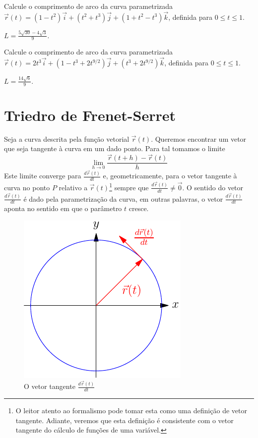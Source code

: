 \begin{exer} \label{exe_co_arc4}
Calcule o comprimento de arco da curva parametrizada $\vec{r}(t) = (1-t^2) \vec{i} + (t^2+t^3) \vec{j} + (1+t^2-t^3)\vec{k}$, definida para $0 \leq t \leq 1$.
\end{exer}
\begin{resp} $ L = \frac{5 \sqrt{30}-4\sqrt{3}}{9} $.
\end{resp}



\begin{exer} \label{exe_co_arc5}
Calcule o comprimento de arco da curva parametrizada $\vec{r}(t) = 2t^3 \vec{i} + (1-t^3+2t^{9/2}) \vec{j} + (t^3+2t^{9/2})\vec{k}$, definida para $0 \leq t \leq 1$. 
\end{exer}
\begin{resp}
  $ L = \frac{14\sqrt{6}}{9}.$
\end{resp}



\section{Triedro de Frenet-Serret}

Seja a curva descrita pela função vetorial $\vec{r}(t)$. Queremos encontrar um vetor que seja tangente à curva em um dado ponto. Para tal tomamos o limite
$$\lim_{h\to 0} \frac{\vec{r}(t+h)-\vec{r}(t)}{h}$$  
Este limite converge para $\frac{d\vec{r}(t)}{dt}$ e, geometricamente, para o vetor tangente à curva no ponto $P$ relativo a $\vec{r}(t)$\footnote{O leitor atento ao formalismo pode tomar esta como uma definição de vetor tangente. Adiante, veremos que esta definição é consistente com o vetor tangente do cálculo de funções de uma variável.} sempre que $\frac{d\vec{r}(t)}{dt} \neq \vec{0}$. O sentido do vetor $\frac{d\vec{r}(t)}{dt}$ é dado pela parametrização da curva, em outras palavras, o vetor $\frac{d\vec{r}(t)}{dt}$ aponta no sentido em que o parâmetro $t$ cresce.


\begin{figure}%
\begin{center}
    \includegraphics{./cap_curvas/figs/vetor_tangente_circunferencia}
\caption{O vetor tangente $\frac{d\vec{r}(t)}{dt}$}\label{circtang}
  \end{center}
\end{figure}


